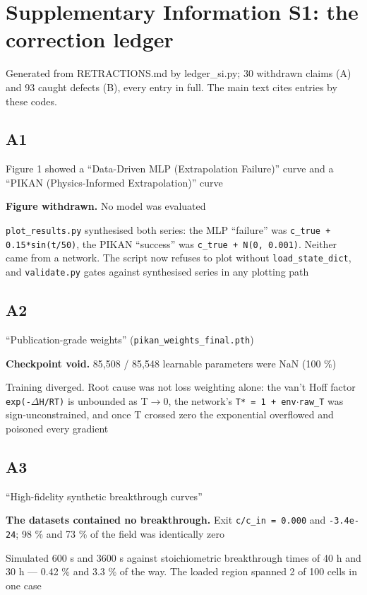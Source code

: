 \documentclass[10pt]{article}
\begin{document}
\section*{Supplementary Information S1: the correction ledger}
Generated from RETRACTIONS.md by ledger\_si.py; 30 withdrawn claims (A) and 93 caught defects (B), every entry in full. The main text cites entries by these codes.

\subsection*{A1}\label{led:A1}
\begin{description}[leftmargin=0pt,itemsep=1pt]
\item[Claim withdrawn.] Figure 1 showed a ``Data-Driven MLP (Extrapolation Failure)'' curve and a ``PIKAN (Physics-Informed Extrapolation)'' curve
\item[Replaced with.] \textbf{Figure withdrawn.} No model was evaluated
\item[Why it was wrong.] \texttt{plot\_results.py} synthesised both series: the MLP ``failure'' was \texttt{c\_true + 0.15*sin(t/50)}, the PIKAN ``success'' was \texttt{c\_true + N(0, 0.001)}. Neither came from a network. The script now refuses to plot without \texttt{load\_state\_dict}, and \texttt{validate.py} gates against synthesised series in any plotting path
\end{description}
\subsection*{A2}\label{led:A2}
\begin{description}[leftmargin=0pt,itemsep=1pt]
\item[Claim withdrawn.] ``Publication-grade weights'' (\texttt{pikan\_weights\_final.pth})
\item[Replaced with.] \textbf{Checkpoint void.} 85,508 / 85,548 learnable parameters were NaN (100 \%)
\item[Why it was wrong.] Training diverged. Root cause was not loss weighting alone: the van't Hoff factor \texttt{exp(-$\Delta$H/RT)} is unbounded as T$\rightarrow$0, the network's \texttt{T* = 1 + env$\cdot$raw\_T} was sign-unconstrained, and once T crossed zero the exponential overflowed and poisoned every gradient
\end{description}
\subsection*{A3}\label{led:A3}
\begin{description}[leftmargin=0pt,itemsep=1pt]
\item[Claim withdrawn.] ``High-fidelity synthetic breakthrough curves''
\item[Replaced with.] \textbf{The datasets contained no breakthrough.} Exit \texttt{c/c\_in = 0.000} and \texttt{-3.4e-24}; 98 \% and 73 \% of the field was identically zero
\item[Why it was wrong.] Simulated 600 s and 3600 s against stoichiometric breakthrough times of 40 h and 30 h --- 0.42 \% and 3.3 \% of the way. The loaded region spanned 2 of 100 cells in one case
\end{description}
\end{document}
